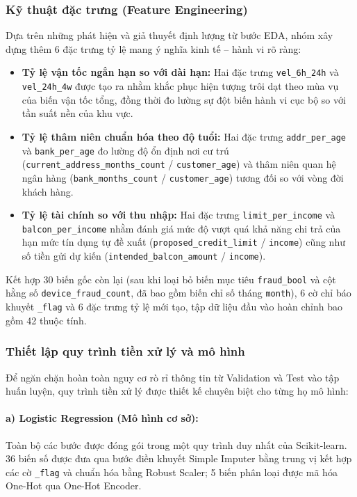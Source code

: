 \subsubsection{Kỹ thuật đặc trưng (Feature Engineering)}
Dựa trên những phát hiện và giả thuyết định lượng từ bước EDA, nhóm xây dựng thêm 6 đặc trưng tỷ lệ mang ý nghĩa kinh tế -- hành vi rõ ràng:
\begin{itemize}[leftmargin=*]
  \item \textbf{Tỷ lệ vận tốc ngắn hạn so với dài hạn:} Hai đặc trưng \texttt{vel\_6h\_24h} và \texttt{vel\_24h\_4w} được tạo ra nhằm khắc phục hiện tượng trôi dạt theo mùa vụ của biến vận tốc tổng, đồng thời đo lường sự đột biến hành vi cục bộ so với tần suất nền của khu vực.
  \item \textbf{Tỷ lệ thâm niên chuẩn hóa theo độ tuổi:} Hai đặc trưng \texttt{addr\_per\_age} và \texttt{bank\_per\_age} đo lường độ ổn định nơi cư trú (\texttt{current\_address\_months\_count} / \texttt{customer\_age}) và thâm niên quan hệ ngân hàng (\texttt{bank\_months\_count} / \texttt{customer\_age}) tương đối so với vòng đời khách hàng.
  \item \textbf{Tỷ lệ tài chính so với thu nhập:} Hai đặc trưng \texttt{limit\_per\_income} và \texttt{balcon\_per\_income} nhằm đánh giá mức độ vượt quá khả năng chi trả của hạn mức tín dụng tự đề xuất (\texttt{proposed\_credit\_limit} / \texttt{income}) cũng như số tiền gửi dự kiến (\texttt{intended\_balcon\_amount} / \texttt{income}).
\end{itemize}

Kết hợp 30 biến gốc còn lại (sau khi loại bỏ biến mục tiêu \texttt{fraud\_bool} và cột hằng số \texttt{device\_fraud\_count}, đã bao gồm biến chỉ số tháng \texttt{month}), 6 cờ chỉ báo khuyết \texttt{\_flag} và 6 đặc trưng tỷ lệ mới tạo, tập dữ liệu đầu vào hoàn chỉnh bao gồm 42 thuộc tính.

\subsubsection{Thiết lập quy trình tiền xử lý và mô hình}
Để ngăn chặn hoàn toàn nguy cơ rò rỉ thông tin từ Validation và Test vào tập huấn luyện, quy trình tiền xử lý được thiết kế chuyên biệt cho từng họ mô hình:

\paragraph{a) Logistic Regression (Mô hình cơ sở):}
Toàn bộ các bước được đóng gói trong một quy trình duy nhất của Scikit-learn. 36 biến số được đưa qua bước điền khuyết Simple Imputer bằng trung vị kết hợp các cờ \texttt{\_flag} và chuẩn hóa bằng Robust Scaler; 5 biến phân loại được mã hóa One-Hot qua One-Hot Encoder.

